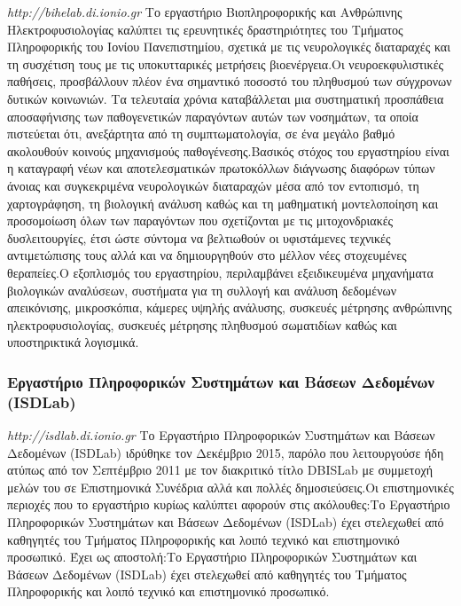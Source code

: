 \emph{http://bihelab.di.ionio.gr} Το εργαστήριο Βιοπληροφορικής και
Ανθρώπινης Ηλεκτροφυσιολογίας καλύπτει τις ερευνητικές δραστηριότητες
του Τμήματος Πληροφορικής του Ιονίου Πανεπιστημίου, σχετικά με τις
νευρολογικές διαταραχές και τη συσχέτιση τους με τις υποκυτταρικές
μετρήσεις βιοενέργεια.Οι νευροεκφυλιστικές παθήσεις, προσβάλλουν πλέον
ένα σημαντικό ποσοστό του πληθυσμού των σύγχρονων δυτικών κοινωνιών. Τα
τελευταία χρόνια καταβάλλεται μια συστηματική προσπάθεια αποσαφήνισης
των παθογενετικών παραγόντων αυτών των νοσημάτων, τα οποία πιστεύεται
ότι, ανεξάρτητα από τη συμπτωματολογία, σε ένα μεγάλο βαθμό ακολουθούν
κοινούς μηχανισμούς παθογένεσης.Βασικός στόχος του εργαστηρίου είναι η
καταγραφή νέων και αποτελεσματικών πρωτοκόλλων διάγνωσης διαφόρων τύπων
άνοιας και συγκεκριμένα νευρολογικών διαταραχών μέσα από τον εντοπισμό,
τη χαρτογράφηση, τη βιολογική ανάλυση καθώς και τη μαθηματική
μοντελοποίηση και προσομοίωση όλων των παραγόντων που σχετίζονται με τις
μιτοχονδριακές δυσλειτουργίες, έτσι ώστε σύντομα να βελτιωθούν οι
υφιστάμενες τεχνικές αντιμετώπισης τους αλλά και να δημιουργηθούν στο
μέλλον νέες στοχευμένες θεραπείες.Ο εξοπλισμός του εργαστηρίου,
περιλαμβάνει εξειδικευμένα μηχανήματα βιολογικών αναλύσεων, συστήματα
για τη συλλογή και ανάλυση δεδομένων απεικόνισης, μικροσκόπια, κάμερες
υψηλής ανάλυσης, συσκευές μέτρησης ανθρώπινης ηλεκτροφυσιολογίας,
συσκευές μέτρησης πληθυσμού σωματιδίων καθώς και υποστηρικτικά
λογισμικά.

\hypertarget{ux3b5ux3c1ux3b3ux3b1ux3c3ux3c4ux3aeux3c1ux3b9ux3bf-ux3c0ux3bbux3b7ux3c1ux3bfux3c6ux3bfux3c1ux3b9ux3baux3ceux3bd-ux3c3ux3c5ux3c3ux3c4ux3b7ux3bcux3acux3c4ux3c9ux3bd-ux3baux3b1ux3b9-ux3b2ux3acux3c3ux3b5ux3c9ux3bd-ux3b4ux3b5ux3b4ux3bfux3bcux3adux3bdux3c9ux3bd-isdlab}{%
\subsubsection{Εργαστήριο Πληροφορικών Συστημάτων και Βάσεων Δεδομένων
(ISDLab)}\label{ux3b5ux3c1ux3b3ux3b1ux3c3ux3c4ux3aeux3c1ux3b9ux3bf-ux3c0ux3bbux3b7ux3c1ux3bfux3c6ux3bfux3c1ux3b9ux3baux3ceux3bd-ux3c3ux3c5ux3c3ux3c4ux3b7ux3bcux3acux3c4ux3c9ux3bd-ux3baux3b1ux3b9-ux3b2ux3acux3c3ux3b5ux3c9ux3bd-ux3b4ux3b5ux3b4ux3bfux3bcux3adux3bdux3c9ux3bd-isdlab}}

\emph{http://isdlab.di.ionio.gr} Το Εργαστήριο Πληροφορικών Συστημάτων
και Βάσεων Δεδομένων (ISDLab) ιδρύθηκε τον Δεκέμβριο 2015, παρόλο που
λειτουργούσε ήδη ατύπως από τον Σεπτέμβριο 2011 με τον διακριτικό τίτλο
DBISLab με συμμετοχή μελών του σε Επιστημονικά Συνέδρια αλλά και πολλές
δημοσιεύσεις.Οι επιστημονικές περιοχές που το εργαστήριο κυρίως καλύπτει
αφορούν στις ακόλουθες:Το Εργαστήριο Πληροφορικών Συστημάτων και Βάσεων
Δεδομένων (ISDLab) έχει στελεχωθεί από καθηγητές του Τμήματος
Πληροφορικής και λοιπό τεχνικό και επιστημονικό προσωπικό. Έχει ως
αποστολή:Το Εργαστήριο Πληροφορικών Συστημάτων και Βάσεων Δεδομένων
(ISDLab) έχει στελεχωθεί από καθηγητές του Τμήματος Πληροφορικής και
λοιπό τεχνικό και επιστημονικό προσωπικό.

